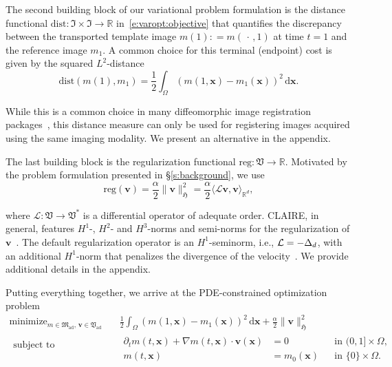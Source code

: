 \documentclass[11pt]{amsart}
\newcommand{\secref}[1]{\S\ref{#1}}
\newcommand\fs[1]{\ensuremath{\mathfrak{#1}}}
\newcommand\op[1]{\ensuremath{\mathcal{#1}}}
\newcommand\igrad{\ensuremath{\nabla}}
\newcommand{\ilap}{\rotatebox[origin=c]{180}{$\nabla$}}
\newcommand{\defeq}{\ensuremath{\mathrel{\mathop:}=}}
\DeclareMathOperator*\minopt{\ensuremath{minimize}}
\newcommand{\reg}{\ensuremath{\text{reg}}}
\newcommand{\dist}{\ensuremath{\text{dist}}}
\newcommand{\st}{\ensuremath{\text{subject to}}}
\renewcommand{\d}{\ensuremath{\text{d}}}
\renewcommand{\vec}[1]{\ensuremath{\boldsymbol{#1}}}
\newcommand\dual{\ensuremath{\ast}}
\begin{document}
The second building block of our variational problem formulation is the distance functional $\dist : \fs{I} \times \fs{I} \to \mathbb{R}$ in~\eqref{e:varopt:objective} that quantifies the discrepancy between the transported template image $m(1) \defeq m(\,\cdot\,, 1)$ at time $t=1$ and the reference image $m_1$. A common choice for this terminal (endpoint) cost is given by the squared $L^2$-distance
\[
\dist(m(1), m_1)
= \frac{1}{2}\int_{\Omega} ( m(1,\vec{x}) - m_1(\vec{x}) )^2 \, \d \vec{x}.
\]

\noindent While this is a common choice in many diffeomorphic image registration packages~\cite{Beg:2005a,Mang:2019a}, this distance measure can only be used for registering images acquired using the same imaging modality. We present an alternative in the appendix.

The last building block is the regularization functional $\reg : \fs{V} \to \mathbb{R}$. Motivated by the problem formulation presented in \secref{s:background}, we use
\[
\reg(\vec{v})
= \frac{\alpha}{2} \|\vec{v}\|_{\fs{H}}^2
= \frac{\alpha}{2} \langle\op{L}\vec{v},\vec{v}\rangle_{\mathbb{R}^d},
\]

\noindent where $\op{L} : \fs{V} \to \fs{V}^\dual$ is a differential operator of adequate order. CLAIRE, in general, features $H^1$-, $H^2$- and $H^3$-norms and semi-norms for the regularization of $\vec{v}$~\cite{Mang:2015a,Mang:2019a,Mang:2016a}. The default regularization operator is an $H^1$-seminorm, i.e., $\op{L} = -\ilap_d$, with an additional $H^1$-norm that penalizes the divergence of the velocity~\cite{Mang:2019a,Brunn:2020a,Brunn:2021a,Himthani:2022a}. We provide additional details in the appendix.

Putting everything together, we arrive at the PDE-constrained optimization problem
\begin{subequations}\label{e:varopt-claire}
\begin{align}
\minopt_{m \in \fs{M}_{\text{ad}}, \, \vec{v} \in \fs{V}_{\text{ad}}}\quad
&
\frac{1}{2}\int_{\Omega} (m(1,\vec{x}) - m_1(\vec{x}) )^2\, \d \vec{x}
+ \frac{\alpha}{2} \|\vec{v}\|_{\fs{H}}^2
\\
\begin{aligned}
\st \\ \\
\end{aligned}
\quad&
\begin{aligned}
\partial_t m(t,\vec{x}) + \igrad m(t,\vec{x}) \cdot \vec{v}(\vec{x})  & = 0
&& \text{in}\,\,(0,1] \times \Omega,
\\
m(t,\vec{x}) &=  m_0(\vec{x})
&& \text{in}\,\,\{0\} \times \Omega.
\end{aligned}
\end{align}
\end{subequations}
\end{document}
